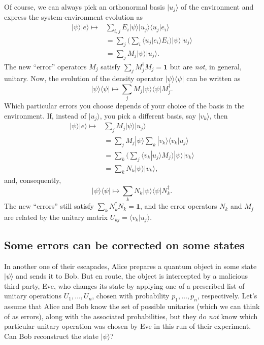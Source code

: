 \documentclass[fleqn]{article}
\begin{document}
Of course, we can always pick an orthonormal basis \(|u_j\rangle\) of the environment and express the system-environment evolution as
\[
  \begin{aligned}
    |\psi\rangle|e\rangle
    \longmapsto &\sum_{i,j} E_i|\psi\rangle|u_j\rangle\langle u_j|e_i\rangle
    \\&= \sum_{j}\Big( \sum_i \langle u_j|e_i\rangle E_i\Big)|\psi\rangle|u_j\rangle
    \\&= \sum_j M_j|\psi\rangle|u_j\rangle.
  \end{aligned}
\]
The new ``error'' operators \(M_j\) satisfy \(\sum_j M_j^\dagger M_j =\mathbf{1}\) but are \emph{not}, in general, unitary.
Now, the evolution of the density operator \(|\psi\rangle\langle\psi|\) can be written as
\[
  |\psi\rangle\langle\psi|\longmapsto \sum_j M_j|\psi\rangle\langle\psi| M_j^\dagger.
\]
Which particular errors you choose depends of your choice of the basis in the environment.
If, instead of \(|u_j\rangle\), you pick a different basis, say \(|v_k\rangle\), then
\[
  \begin{aligned}
    |\psi\rangle|e\rangle
    \longmapsto &\sum_j M_j|\psi\rangle|u_j\rangle
  \\&= \sum_j M_j |\psi\rangle\sum_k|v_k\rangle\langle v_k|u_j\rangle
  \\&= \sum_k \Big(\sum_j \langle v_k|u_j\rangle M_j \Big)|\psi\rangle|v_k\rangle
  \\&= \sum_k N_k|\psi\rangle|v_k\rangle,
  \end{aligned}
\]
and, consequently,
\[
  |\psi\rangle\langle\psi|\longmapsto \sum_k N_k|\psi\rangle\langle\psi| N_k^\dagger.
\]
The new ``errors'' still satisfy \(\sum_k N_k^\dagger N_k = \mathbf{1}\), and the error operators \(N_k\) and \(M_j\) are related by the unitary matrix \(U_{kj}=\langle v_k|u_j\rangle\).

\hypertarget{some-errors-can-be-corrected-on-some-states}{%
\subsection{Some errors can be corrected on some states}\label{some-errors-can-be-corrected-on-some-states}}

In another one of their escapades, Alice prepares a quantum object in some state \(|\psi\rangle\) and sends it to Bob.
But en route, the object is intercepted by a malicious third party, Eve, who changes its state by applying one of a prescribed list of unitary operations \(U_1,\ldots,U_n\), chosen with probability \(p_1,\ldots,p_n\), respectively.
Let's assume that Alice and Bob know the set of possible unitaries (which we can think of as errors), along with the associated probabilities, but they do \emph{not} know which particular unitary operation was chosen by Eve in this run of their experiment.
Can Bob reconstruct the state \(|\psi\rangle\)?
\end{document}
